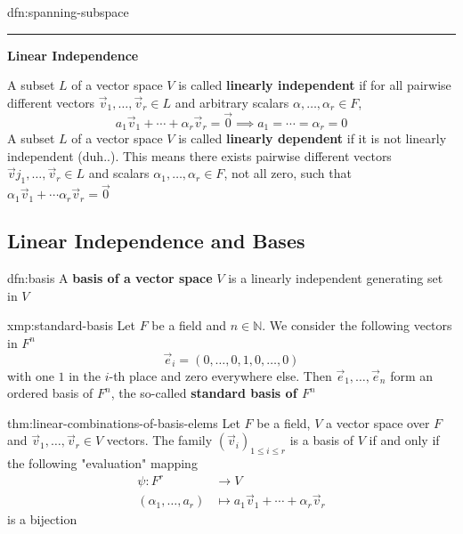 \documentclass[landscape, 8pt]{extarticle}
\begin{document}
\begin{multicols}{3}
\begin{dfn}{dfn:spanning-subspace}{}
    \vspace{-5pt}
    \noindent\rule{\textwidth}{0.2pt}

    \textbf{Linear Independence}
    \vspace{5pt}

    A subset $L$ of a vector space $V$ is called \textbf{linearly independent} if for all pairwise different vectors $\vec{v}_{1},\dots,\vec{v}_{r}\in L$ and arbitrary scalars $\alpha,\dots,\alpha_{r}\in F$,
    \[a_{1}\vec{v}_{1} + \cdots + \alpha_{r}\vec{v}_{r} = \vec{0} \implies a_{1} = \cdots = \alpha_{r} = 0\]
    A subset $L$ of a vector space $V$ is called \textbf{linearly dependent} if it is not linearly independent (duh..). This means there exists pairwise different vectors $\vec{v}j_{1},\dots,\vec{v}_{r}\in L$ and scalars $\alpha_{1},\dots,\alpha_{r}\in F$, not all zero, such that $\alpha_{1}\vec{v}_{1} + \cdots \alpha_{r}\vec{v}_{r} = \vec{0}$
\end{dfn}

\subsection{Linear Independence and Bases}

\begin{dfn}{dfn:basis}{}
    A \textbf{basis of a vector space} $V$ is a linearly independent generating set in $V$
\end{dfn}

\begin{xmp}{xmp:standard-basis}{}
    Let $F$ be a field and $n\in \mathbb{N}$. We consider the following vectors in $F^{n}$
    \[\vec{e}_{i} = (0,\dots,0,1,0,\dots,0)\]
    with one $1$ in the $i$-th place and zero everywhere else. Then $\vec{e}_{1} ,\dots, \vec{e}_{n}$ form an ordered basis of $F^{n}$, the so-called \textbf{standard basis of $F^{n}$}
\end{xmp}

\begin{thm}{thm:linear-combinations-of-basis-elems}{}
    Let $F$ be a field, $V$ a vector space over $F$ and $\vec{v}_{1},\dots,\vec{v}_{r}\in V$ vectors. The family $(\vec{v}_{i})_{1\le i\le r}$ is a basis of $V$ if and only if the following "evaluation" mapping
    \begin{align*}
        \psi : F^{r} &\to V\\
        (\alpha_{1},\dots,a_{r}) &\mapsto a_{1}\vec{v}_{1} + \cdots + \alpha_{r}\vec{v}_{r}
    \end{align*}
    is a bijection


\end{thm}
\end{multicols}
\end{document}
